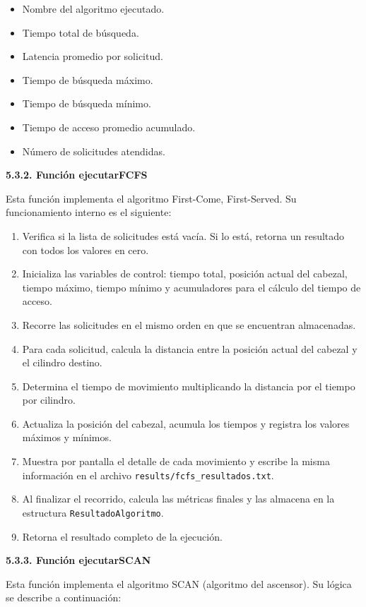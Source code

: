 \documentclass[14pt,letterpaper]{extarticle}
\begin{document}
\begin{itemize}
    \item Nombre del algoritmo ejecutado.
    \item Tiempo total de búsqueda.
    \item Latencia promedio por solicitud.
    \item Tiempo de búsqueda máximo.
    \item Tiempo de búsqueda mínimo.
    \item Tiempo de acceso promedio acumulado.
    \item Número de solicitudes atendidas.
\end{itemize}

\textbf{5.3.2. Función ejecutarFCFS}

Esta función implementa el algoritmo First-Come, First-Served. Su funcionamiento interno es el siguiente:

\begin{enumerate}
    \item Verifica si la lista de solicitudes está vacía. Si lo está, retorna un resultado con todos los valores en cero.
    \item Inicializa las variables de control: tiempo total, posición actual del cabezal, tiempo máximo, tiempo mínimo y acumuladores para el cálculo del tiempo de acceso.
    \item Recorre las solicitudes en el mismo orden en que se encuentran almacenadas.
    \item Para cada solicitud, calcula la distancia entre la posición actual del cabezal y el cilindro destino.
    \item Determina el tiempo de movimiento multiplicando la distancia por el tiempo por cilindro.
    \item Actualiza la posición del cabezal, acumula los tiempos y registra los valores máximos y mínimos.
    \item Muestra por pantalla el detalle de cada movimiento y escribe la misma información en el archivo \texttt{results/fcfs\_resultados.txt}.
    \item Al finalizar el recorrido, calcula las métricas finales y las almacena en la estructura \texttt{ResultadoAlgoritmo}.
    \item Retorna el resultado completo de la ejecución.
\end{enumerate}

\textbf{5.3.3. Función ejecutarSCAN}

Esta función implementa el algoritmo SCAN (algoritmo del ascensor). Su lógica se describe a continuación:
\end{document}

